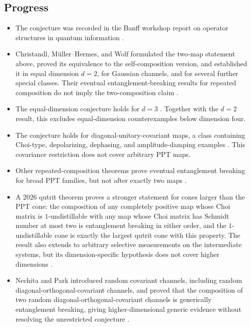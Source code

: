 \subsection*{Progress}

\begin{itemize}
  \item The conjecture was recorded in the Banff workshop report on operator
  structures in quantum information
  .

  \item Christandl, M\"uller--Hermes, and Wolf formulated the two-map
  statement above, proved its equivalence to the self-composition version,
  and established it in equal dimension $d=2$, for Gaussian channels, and
  for several further special classes.  Their eventual
  entanglement-breaking results for repeated composition do not imply the
  two-composition claim .

  \item The equal-dimension conjecture holds for $d=3$
  . Together with the $d=2$ result, this
  excludes equal-dimension counterexamples below dimension four.

  \item The conjecture holds for diagonal-unitary-covariant maps, a class
  containing Choi-type, depolarizing, dephasing, and amplitude-damping
  examples .  This covariance restriction
  does not cover arbitrary PPT maps.

  \item Other repeated-composition theorems prove eventual entanglement
  breaking for broad PPT families, but not after exactly two maps
  .

  \item A 2026 qutrit theorem proves a stronger statement for cones larger
  than the PPT cone: the composition of any completely positive map whose
  Choi matrix is $1$-undistillable with any map whose Choi matrix has
  Schmidt number at most two is entanglement breaking in either order, and
  the $1$-undistillable cone is exactly the largest qutrit cone with this
  property.  The result also extends to arbitrary selective measurements
  on the intermediate systems, but its dimension-specific hypothesis
  does not cover higher dimensions .

  \item Nechita and Park introduced random covariant channels, including random
  diagonal-orthogonal-covariant channels, and proved that the composition of
  two random diagonal-orthogonal-covariant channels is generically
  entanglement breaking, giving higher-dimensional generic evidence without
  resolving the unrestricted conjecture
  .


\end{itemize}
